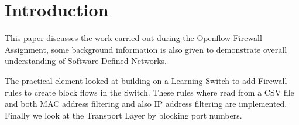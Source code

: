 \section{Introduction}
This paper discusses the work carried out during the Openflow Firewall Assignment, some background information is also given to demonstrate overall understanding of Software Defined Networks.

The practical element looked at building on a Learning Switch to add Firewall rules to create block flows in the Switch. These rules where read from a CSV file and both MAC address filtering and also IP address filtering are implemented. Finally we look at the Transport Layer by blocking port numbers.